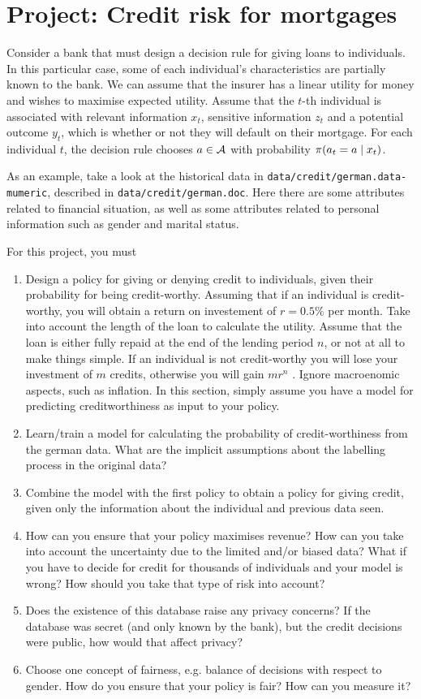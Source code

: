 \section{Project: Credit risk for mortgages}

Consider a bank that must design a decision rule for giving loans to individuals. In this particular case, some of each individual's characteristics are partially known to the bank.  We can assume that the insurer has a linear utility for money and wishes to maximise expected utility. Assume that the $t$-th individual is associated with relevant information $x_t$, sensitive information $z_t$ and a potential outcome $y_t$, which is whether or not they will default on their mortgage. For each individual $t$, the decision rule chooses $a \in {\mathcal{A}}$ with probability $\pi(a_t = a \mid x_t)$.

As an example, take a look at the historical data in \texttt{data/credit/german.data-mumeric}, described in \texttt{data/credit/german.doc}. Here there are some attributes related to financial situation, as well as some attributes related to personal information such as gender and marital status. 

For this project, you must
\begin{enumerate}
\item Design a policy for giving or denying credit to individuals, given their probability for being credit-worthy. Assuming that if an individual is credit-worthy, you will obtain a return on investement of $r = 0.5\%$ per month. Take into account the length of the loan to calculate the utility. Assume that the loan is either fully repaid at the end of the lending period $n$, or not at all to make things simple. If an individual is not credit-worthy you will lose your investment of $m$ credits, otherwise you will gain $m r^{n}$ . Ignore macroenomic aspects, such as inflation. In this section, simply assume you have a model for predicting creditworthiness as input to your policy.
\item Learn/train a model for calculating the probability of credit-worthiness from the german data. What are the implicit assumptions about the labelling process in the original data?
\item Combine the model with the first policy to obtain a policy for giving credit, given only the information about the individual and previous data seen.
\item How can you ensure that your policy maximises revenue? How can you take into account the uncertainty due to the limited and/or biased data? What if you have to decide for credit for thousands of individuals and your model is wrong? How should you take that type of risk into account? 
\item Does the existence of this database raise any privacy concerns? If the database was secret (and only known by the bank), but the credit decisions were public, how would that affect privacy?
\item Choose one concept of fairness, e.g. balance of decisions with respect to gender. How do you ensure that your policy is fair? How can you measure it?
\end{enumerate}


